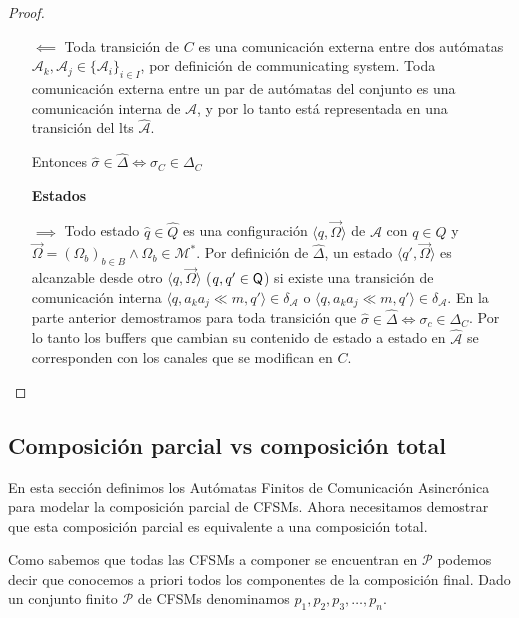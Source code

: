 \begin{prop}
\begin{proof}
\begin{itemize}
    \item[$\impliedby$]Toda transición de $C$ es una comunicación externa entre dos autómatas $\mathcal{A}_k, \mathcal{A}_j \in \{\mathcal{A}_i\}_{i \in I}$, por definición de communicating system. Toda comunicación externa entre un par de autómatas del conjunto es una comunicación interna de $\mathcal{A}$, y por lo tanto está representada en una transición del lts $\hat{\mathcal{A}}$. 
    \item[] Entonces $\hat{\sigma} \in \hat{\Delta} \iff \sigma_C \in \Delta_C$
    \item[\textbf{Estados}]
    \item[$\implies$]Todo estado $\hat{q} \in \hat{Q}$ es una configuración $\langle q, \overrightarrow{\Omega} \rangle$ de $\mathcal{A}$ con $q \in Q$ y $\overrightarrow{\Omega} = (\Omega_b)_{b \in B} \land \Omega_b \in \mathcal{M}^*$. Por definición de $\hat{\Delta}$, un estado $\langle q', \overrightarrow{\Omega} \rangle$ es alcanzable desde otro $\langle q, \overrightarrow{\Omega} \rangle$ ($q,q' \in \mathbf{\mathsf{Q}}$) si existe una transición de comunicación interna $\langle q,a_ka_j \ll m ,q' \rangle \in \delta_{\mathcal{A}}$ o $\langle q,a_ka_j \ll m ,q' \rangle \in \delta_{\mathcal{A}}$. En la parte anterior demostramos para toda transición que $\hat{\sigma} \in \hat{\Delta} \iff \sigma_c \in \Delta_C$. Por lo tanto los buffers que cambian su contenido de estado a estado en $\hat{\mathcal{A}}$ se corresponden con los canales que se modifican en $C$. 
\end{itemize}

\end{proof}
\end{prop}

\newpage
\subsection{Composición parcial vs composición total}

En esta sección definimos los Autómatas Finitos de Comunicación Asincrónica para modelar la composición parcial de CFSMs. Ahora necesitamos demostrar que esta composición parcial es equivalente a una composición total.

Como sabemos que todas las CFSMs a componer se encuentran en $\mathcal{P}$ podemos decir que conocemos a priori todos los componentes de la composición final. Dado un conjunto finito $\mathcal{P}$ de CFSMs denominamos $ p_1, p_2, p_3, \ldots, p_n$. 

